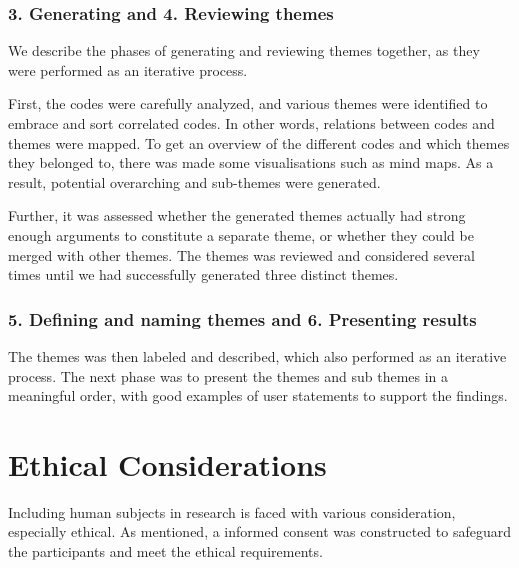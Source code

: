 \subsubsection{3. Generating and 4. Reviewing themes}
We describe the phases of generating and reviewing themes together, as they were performed as an iterative process. 

First, the codes were carefully analyzed, and various themes were identified to embrace and sort correlated codes. In other words, relations between codes and themes were mapped. To get an overview of the different codes and which themes they belonged to, there was made some visualisations such as mind maps. As a result, potential overarching and sub-themes were generated. 
    
Further, it was assessed whether the generated themes actually had strong enough arguments to constitute a separate theme, or whether they could be merged with other themes. The themes was reviewed and considered several times until we had successfully generated three distinct themes.

 \subsubsection{5. Defining and naming themes and 6. Presenting results}
The themes was then labeled and described, which also performed as an iterative process. The next phase was to present the themes and sub themes in a meaningful order, with good examples of user statements to support the findings.  

\section{Ethical Considerations}
Including human subjects in research is faced with various consideration, especially ethical. As mentioned, a informed consent was constructed to safeguard the participants and meet the ethical requirements. 

